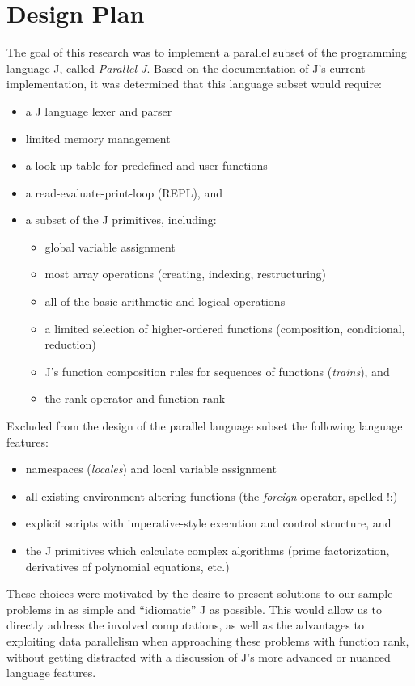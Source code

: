 \section{Design Plan}
\label{desp}
The goal of this research was
to implement a parallel subset of the programming language J, called \textit{Parallel-J}.
Based on the documentation of J's current implementation\cite{ioj}, it was determined that this language subset would require:
\begin{itemize}
	\item a J language lexer and parser
	\item limited memory management
	\item a look-up table for predefined and user functions
	\item a read-evaluate-print-loop (REPL), and
	\item a subset of the J primitives, including: 
	\begin{itemize}
		\item global variable assignment
		\item most array operations (creating, indexing, restructuring)
		\item all of the basic arithmetic and logical operations
		\item a limited selection of higher-ordered functions (composition, conditional, reduction)
		\item J's function composition rules for sequences of functions (\textit{trains}), and
		\item the rank operator and function rank
	\end{itemize}
\end{itemize}

Excluded from the design of the parallel language subset the following language features: 
\begin{itemize}
	\item namespaces (\textit{locales}) and local variable assignment
	\item all existing environment-altering functions (the \textit{foreign} operator, spelled \ttfamily!:\normalfont)
	\item explicit scripts with imperative-style execution and control structure, and
	\item the J primitives which calculate complex algorithms (prime factorization, derivatives of polynomial equations, etc.)
\end{itemize}

These choices were motivated by the desire to present solutions to our sample problems in as simple and ``idiomatic'' J as possible.
This would allow us to directly address the involved computations, 
as well as the advantages to exploiting data parallelism when approaching these problems with function rank, 
without getting distracted with a discussion of J's more advanced or nuanced language features.

